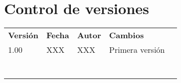 \chapter{Control de versiones}
\begin{table}[h]
	\centering
\begin{tabular}{lllll}
	\cline{1-4}
	\multicolumn{1}{|l}{\cellcolor[HTML]{C0C0C0}\textbf{Versión}} & \cellcolor[HTML]{C0C0C0}\textbf{Fecha} & \cellcolor[HTML]{C0C0C0}\textbf{Autor} & \multicolumn{1}{l|}{\cellcolor[HTML]{C0C0C0}\textbf{Cambios}} &  \\ \cline{1-4}
	\multicolumn{1}{|l}{1.00}                                     & XXX                                    & XXX                                    & \multicolumn{1}{l|}{Primera versión}                          &  \\ \cline{1-4}
	\multicolumn{1}{|l}{}                                         &                                        &                                        & \multicolumn{1}{l|}{}                                         &  \\ \cline{1-4}
	\multicolumn{1}{|l}{}                                         &                                        &                                        & \multicolumn{1}{l|}{}                                         &  \\ \cline{1-4}
	\multicolumn{1}{|l}{}                                         &                                        &                                        & \multicolumn{1}{l|}{}                                         &  \\ \cline{1-4}
	\multicolumn{1}{|l}{}                                         &                                        &                                        & \multicolumn{1}{l|}{}                                         &  \\ \cline{1-4}
	\multicolumn{1}{|l}{}                                         &                                        &                                        & \multicolumn{1}{l|}{}                                         &  \\ \cline{1-4}
	\multicolumn{1}{|l}{}                                         &                                        &                                        & \multicolumn{1}{l|}{}                                         &  \\ \cline{1-4}
	\multicolumn{1}{|l}{}                                         &                                        &                                        & \multicolumn{1}{l|}{}                                         &  \\ \cline{1-4}

\end{tabular}
\end{table}
